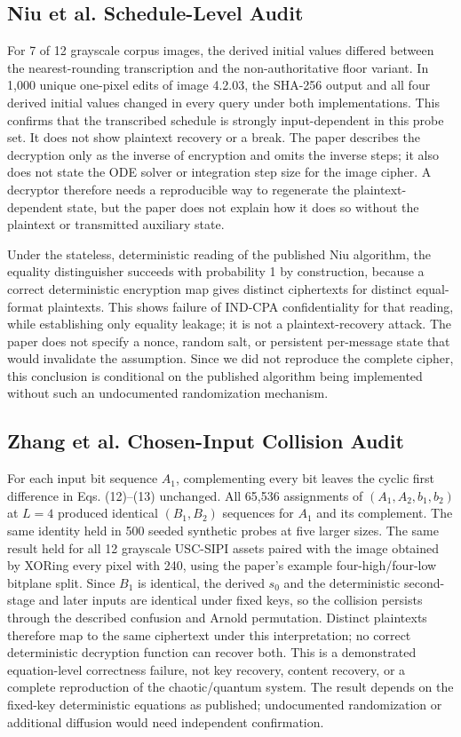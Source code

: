\documentclass[letterpaper,journal]{IEEEtran}
\begin{document}
\subsection{Niu et al. Schedule-Level Audit}
For 7 of 12 grayscale corpus images, the derived initial values differed between the nearest-rounding transcription and the non-authoritative floor variant. In 1,000 unique one-pixel edits of image 4.2.03, the SHA-256 output and all four derived initial values changed in every query under both implementations. This confirms that the transcribed schedule is strongly input-dependent in this probe set. It does not show plaintext recovery or a break. The paper describes the decryption only as the inverse of encryption and omits the inverse steps; it also does not state the ODE solver or integration step size for the image cipher. A decryptor therefore needs a reproducible way to regenerate the plaintext-dependent state, but the paper does not explain how it does so without the plaintext or transmitted auxiliary state.

Under the stateless, deterministic reading of the published Niu algorithm, the equality distinguisher succeeds with probability 1 by construction, because a correct deterministic encryption map gives distinct ciphertexts for distinct equal-format plaintexts. This shows failure of IND-CPA confidentiality for that reading, while establishing only equality leakage; it is not a plaintext-recovery attack. The paper does not specify a nonce, random salt, or persistent per-message state that would invalidate the assumption. Since we did not reproduce the complete cipher, this conclusion is conditional on the published algorithm being implemented without such an undocumented randomization mechanism.

\subsection{Zhang et al. Chosen-Input Collision Audit}
For each input bit sequence $A_1$, complementing every bit leaves the cyclic first difference in Eqs. (12)--(13) unchanged. All 65,536 assignments of $(A_1,A_2,b_1,b_2)$ at $L=4$ produced identical $(B_1,B_2)$ sequences for $A_1$ and its complement. The same identity held in 500 seeded synthetic probes at five larger sizes. The same result held for all 12 grayscale USC-SIPI assets paired with the image obtained by XORing every pixel with 240, using the paper's example four-high/four-low bitplane split. Since $B_1$ is identical, the derived $s_0$ and the deterministic second-stage and later inputs are identical under fixed keys, so the collision persists through the described confusion and Arnold permutation. Distinct plaintexts therefore map to the same ciphertext under this interpretation; no correct deterministic decryption function can recover both. This is a demonstrated equation-level correctness failure, not key recovery, content recovery, or a complete reproduction of the chaotic/quantum system. The result depends on the fixed-key deterministic equations as published; undocumented randomization or additional diffusion would need independent confirmation.
\end{document}
